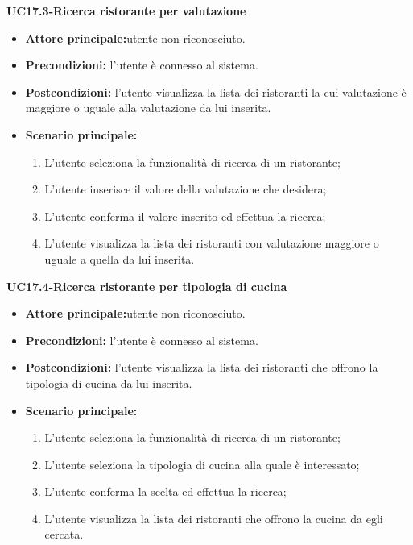 \textbf{UC17.3-Ricerca ristorante per valutazione}
\begin{itemize}
\item \textbf{Attore principale:}utente non riconosciuto.
\item \textbf{Precondizioni:} l'utente è connesso al sistema.
\item \textbf{Postcondizioni:} l'utente visualizza la lista dei ristoranti la cui valutazione è maggiore o uguale alla
valutazione da lui inserita.
\item \textbf{Scenario principale:}
\begin{enumerate}
    \item L'utente seleziona la funzionalità di ricerca di un ristorante;
    \item L'utente inserisce il valore della valutazione che desidera;
    \item L'utente conferma il valore inserito ed effettua la ricerca;
    \item  L'utente visualizza la lista dei ristoranti con valutazione maggiore o uguale a quella da lui inserita.
\end{enumerate}
\end{itemize}

\textbf{UC17.4-Ricerca ristorante per tipologia di cucina}
\begin{itemize}
\item \textbf{Attore principale:}utente non riconosciuto.
\item \textbf{Precondizioni:} l'utente è connesso al sistema.
\item \textbf{Postcondizioni:} l'utente visualizza la lista dei ristoranti che offrono la tipologia di cucina
da lui inserita.
\item \textbf{Scenario principale:}
\begin{enumerate}
    \item L'utente seleziona la funzionalità di ricerca di un ristorante;
    \item L'utente seleziona la tipologia di cucina alla quale è interessato;
    \item L'utente conferma la scelta ed effettua la ricerca; 
    \item L'utente visualizza la lista dei ristoranti che offrono la cucina da egli cercata.
\end{enumerate}
\end{itemize}

